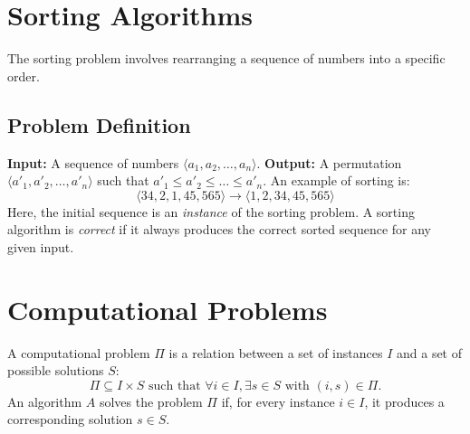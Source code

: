     \section{Sorting Algorithms}
    The sorting problem involves rearranging a sequence of numbers into a specific order. 
    
    \subsection{Problem Definition}
    \textbf{Input:} A sequence of numbers \(\langle a_1, a_2, \dots, a_n \rangle\).  
    \textbf{Output:} A permutation \(\langle a'_1, a'_2, \dots, a'_n \rangle\) such that \(a'_1 \leq a'_2 \leq \dots \leq a'_n\). \newline
    An example of sorting is:
    \[
    \langle 34, 2, 1, 45, 565 \rangle \rightarrow \langle 1, 2, 34, 45, 565 \rangle
    \]
    Here, the initial sequence is an \textit{instance} of the sorting problem. A sorting algorithm is \textit{correct} if it always produces the correct sorted sequence for any given input.
    
    \section{Computational Problems}
    A computational problem \(\Pi\) is a relation between a set of instances \(I\) and a set of possible solutions \(S\):
    \[
    \Pi \subseteq I \times S \text{ such that } \forall i \in I, \exists s \in S \text{ with } (i, s) \in \Pi.
    \]
    An algorithm \(A\) solves the problem \(\Pi\) if, for every instance \(i \in I\), it produces a corresponding solution \(s \in S\).
    
